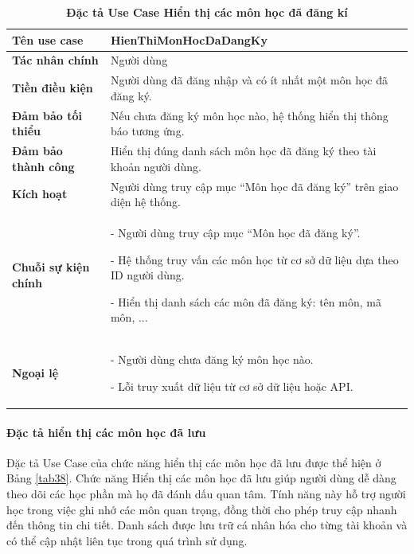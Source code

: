 \documentclass{article}
\begin{document}
	\begin{table}[H]
		\centering
		\caption [Đặc tả Use Case Hiển thị các môn học đã đăng kí]{\bfseries \fontsize{12pt}{0pt}\selectfont Đặc tả Use Case Hiển thị các môn học đã đăng kí}
		\label{tab37}
		\begin{tabular}{|p{4cm}|p{10.5cm}|}
			\hline
			\textbf{Tên use case} & HienThiMonHocDaDangKy \\
			\hline
			\textbf{Tác nhân chính} & Người dùng \\
			\hline
			\textbf{Tiền điều kiện} & Người dùng đã đăng nhập và có ít nhất một môn học đã đăng ký. \\
			\hline
			\textbf{Đảm bảo tối thiểu} & Nếu chưa đăng ký môn học nào, hệ thống hiển thị thông báo tương ứng. \\
			\hline
			\textbf{Đảm bảo thành công} & Hiển thị đúng danh sách môn học đã đăng ký theo tài khoản người dùng. \\
			\hline
			\textbf{Kích hoạt} & Người dùng truy cập mục “Môn học đã đăng ký” trên giao diện hệ thống. \\
			\hline
			\textbf{Chuỗi sự kiện chính} &
			- Người dùng truy cập mục “Môn học đã đăng ký”.
			
			- Hệ thống truy vấn các môn học từ cơ sở dữ liệu dựa theo ID người dùng.
			
			- Hiển thị danh sách các môn đã đăng ký: tên môn, mã môn, ...
			\\
			\hline
			\textbf{Ngoại lệ} &
			- Người dùng chưa đăng ký môn học nào.
			
			- Lỗi truy xuất dữ liệu từ cơ sở dữ liệu hoặc API.
			\\
			\hline
		\end{tabular}
	\end{table}
	
	\paragraph{Đặc tả hiển thị các môn học đã lưu} \mbox{}
	
	Đặc tả Use Case của chức năng hiển thị các môn học đã lưu được thể hiện ở Bảng \ref{tab38}. Chức năng Hiển thị các môn học đã lưu giúp người dùng dễ dàng theo dõi các học phần mà họ đã đánh dấu quan tâm. Tính năng này hỗ trợ người học trong việc ghi nhớ các môn quan trọng, đồng thời cho phép truy cập nhanh đến thông tin chi tiết. Danh sách được lưu trữ cá nhân hóa cho từng tài khoản và có thể cập nhật liên tục trong quá trình sử dụng.
	
\end{document}
